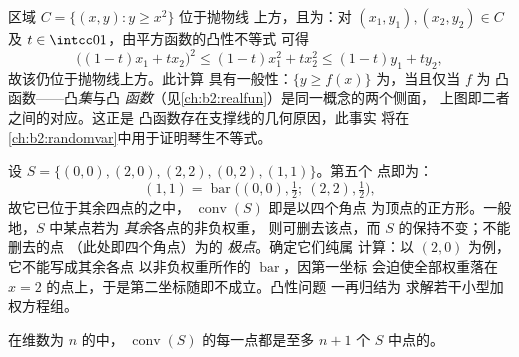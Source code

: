 \begin{example}[上图为
凸集]\label{ex:b2:affine:epigraph}
区域 $C = \{(x, y) : y \geq x^2\}$ 位于抛物线
上方，且为：对 $(x_1, y_1), (x_2, y_2) \in C$ 及 $t \in
\intcc01$，由平方函数的凸性不等式
可得
\[
\bigl((1-t)x_1 + tx_2\bigr)^2 \leq (1-t)x_1^2 + tx_2^2
\leq (1-t)y_1 + ty_2 ,
\]
故该仍位于抛物线上方。此计算
具有一般性：$\{y \geq f(x)\}$ 为，当且仅当 $f$ 为
凸函数——凸\emph{集}与凸
\emph{函数}（见\cref{ch:b2:realfun}）是同一概念的两个侧面，
上图即二者之间的对应。这正是
凸函数存在支撑线的几何原因，此事实
将在
\cref{ch:b2:randomvar}中用于证明琴生不等式。
\end{example}

\begin{example}\label{ex:b2:affine:squarehull}
设 $S = \{(0,0), (2,0), (2,2), (0,2), (1,1)\}$。第五个
点即为：
\[
(1,1) = \operatorname{bar}\bigl((0,0), \tfrac12;\ (2,2),
\tfrac12\bigr),
\]
故它已位于其余四点的之中，
$\operatorname{conv}(S)$ 即是以四个角点
为顶点的正方形。一般地，$S$ 中某点若为
\emph{其余}各点的非负权重，
则可删去该点，而 $S$ 的保持不变；不能删去的点
（此处即四个角点）为的
\emph{极点}。确定它们纯属
计算：以 $(2,0)$ 为例，它不能写成其余各点
以非负权重所作的 $\operatorname{bar}$，因第一坐标
会迫使全部权重落在
$x = 2$ 的点上，于是第二坐标随即不成立。凸性问题
一再归结为
求解若干小型加权方程组。
\end{example}

\begin{theorem}[卡拉泰奥多里]\label{thm:b2:affine:caratheodory}
在维数为 $n$ 的中，
$\operatorname{conv}(S)$ 的每一点都是至多 $n + 1$ 个
$S$ 中点的。
\end{theorem}

